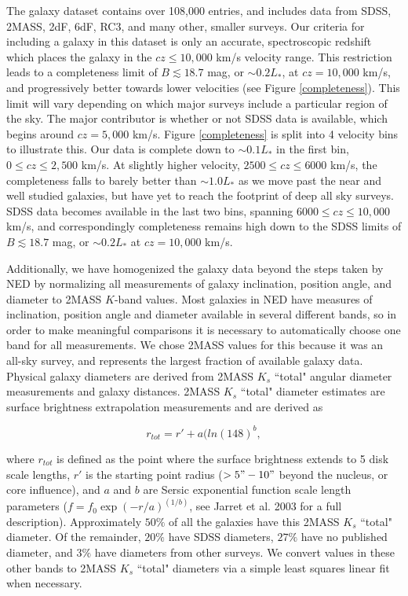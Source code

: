\documentclass[iop]{emulateapj-rtx4}
\begin{document}
The galaxy dataset contains over 108,000 entries, and includes data from SDSS, 2MASS, 2dF, 6dF, RC3, and many other, smaller surveys. Our criteria for including a galaxy in this dataset is only an accurate, spectroscopic redshift which places the galaxy in the $cz \leq 10,000$ km/s velocity range. This restriction leads to a completeness limit of $B \lesssim 18.7$ mag, or $\sim0.2 L_*$, at $cz = 10,000$ km/s, and progressively better towards lower velocities (see Figure \ref{completeness}). This limit will vary depending on which major surveys include a particular region of the sky. The major contributor is whether or not SDSS data is available, which begins around $cz = 5,000$ km/s. Figure \ref{completeness} is split into 4 velocity bins to illustrate this. Our data is complete down to $\sim0.1 L_*$ in the first bin, $0 \leq cz \leq 2,500$ km/s. At slightly higher velocity, $2500 \leq cz \leq 6000$ km/s, the completeness falls to barely better than $\sim1.0 L_*$ as we move past the near and well studied galaxies, but have yet to reach the footprint of deep all sky surveys. SDSS data becomes available in the last two bins, spanning $6000 \leq cz \leq 10,000$ km/s, and correspondingly completeness remains high down to the SDSS limits of $B \lesssim 18.7$ mag, or $\sim0.2 L_*$ at $cz = 10,000$ km/s.


Additionally, we have homogenized the galaxy data beyond the steps taken by NED by normalizing all measurements of galaxy inclination, position angle, and diameter to 2MASS $K$-band values. Most galaxies in NED have measures of inclination, position angle and diameter available in several different bands, so in order to make meaningful comparisons it is necessary to automatically choose one band for all measurements. We chose 2MASS values for this because it was an all-sky survey, and represents the largest fraction of available galaxy data. Physical galaxy diameters are derived from 2MASS $K_s$ ``total" angular diameter measurements and galaxy distances. 2MASS $K_s$ ``total" diameter estimates are surface brightness extrapolation measurements and are derived as 

\begin{equation}
r_{tot} = r' + a(ln(148)^b,
\end{equation}

\noindent where $r_{tot}$ is defined as the point where the surface brightness extends to 5 disk scale lengths, $r'$ is the starting point radius ($>5" - 10"$ beyond the nucleus, or core influence), and $a$ and $b$ are Sersic exponential function scale length parameters ($f = f_0 \exp{(-r/a)}^{(1/b)}$, see Jarret et al. 2003 for a full description). Approximately $50\%$ of all the galaxies have this 2MASS $K_s$ ``total" diameter. Of the remainder, $20\%$ have SDSS diameters, $27\%$ have no published diameter, and $3\%$ have diameters from other surveys. We convert values in these other bands to 2MASS $K_s$ ``total" diameters via a simple least squares linear fit when necessary.
\end{document}
